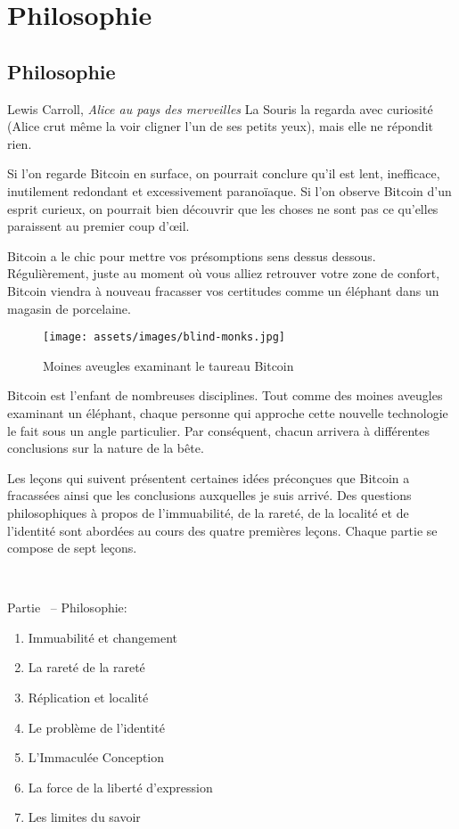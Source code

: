 \part{Philosophie}
\label{ch:philosophy}
\chapter*{Philosophie}

\begin{chapquote}{Lewis Carroll, \textit{Alice au pays des merveilles}}
  La Souris la regarda avec curiosité (Alice crut même la voir cligner l’un de
  ses petits yeux), mais elle ne répondit rien.
\end{chapquote}

Si l'on regarde Bitcoin en surface, on pourrait conclure qu'il est lent,
inefficace, inutilement redondant et excessivement paranoïaque. Si l'on observe
Bitcoin d'un esprit curieux, on pourrait bien découvrir que les choses ne sont
pas ce qu'elles paraissent au premier coup d'œil.

Bitcoin a le chic pour mettre vos présomptions sens dessus dessous.
Régulièrement, juste au moment où vous alliez retrouver votre zone de confort,
Bitcoin viendra à nouveau fracasser vos certitudes comme un éléphant dans un
magasin de porcelaine.

\begin{figure}
  \texttt{[image: assets/images/blind-monks.jpg]}
  \caption{Moines aveugles examinant le taureau Bitcoin}
  \label{fig:blind-monks}
\end{figure}

Bitcoin est l'enfant de nombreuses disciplines. Tout comme des moines aveugles
examinant un éléphant, chaque personne qui approche cette nouvelle technologie
le fait sous un angle particulier. Par conséquent, chacun arrivera à différentes
conclusions sur la nature de la bête.

Les leçons qui suivent présentent certaines idées préconçues que Bitcoin a
fracassées ainsi que les conclusions auxquelles je suis arrivé. Des questions
philosophiques à propos de l'immuabilité, de la rareté, de la localité et de
l'identité sont abordées au cours des quatre premières leçons. Chaque partie se
compose de sept leçons.

~

\begin{samepage}
Partie~\ref{ch:philosophy} -- Philosophie:

\begin{enumerate}
  \item Immuabilité et changement
  \item La rareté de la rareté
  \item Réplication et localité
  \item Le problème de l'identité
  \item L'Immaculée Conception
  \item La force de la liberté d'expression
  \item Les limites du savoir
\end{enumerate}
\end{samepage}

